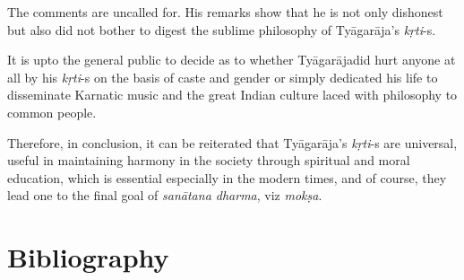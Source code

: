 The comments are uncalled for. His remarks show that he is not only dishonest but also did not bother to digest the sublime philosophy of Tyāgarāja’s \textit{kṛti}-s. 

It is upto the general public to decide as to whether Tyāgarājadid hurt anyone at all by his \textit{kṛti}-s on the basis of caste and gender or simply dedicated his life to disseminate Karnatic music and the great Indian culture laced with philosophy to common people.

Therefore, in conclusion, it can be reiterated that Tyāgarāja’s \textit{kṛti}-s are universal, useful in maintaining harmony in the society through spiritual and moral education, which is essential especially in the modern times, and of course, they lead one to the final goal of \textit{sanātana dharma}, viz \textit{mokṣa}.


\section*{Bibliography}

